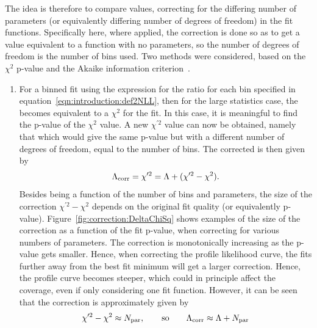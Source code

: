 The idea is therefore to compare \nll values,
correcting for the differing number of parameters
(or equivalently differing number of degrees of freedom) in
the fit functions. Specifically here, where applied, the correction is
done so as to get a value equivalent to a function with no parameters, so
the number of degrees of freedom is the number of bins used.
Two methods were considered, based on the
$\chi^2$ p-value and the Akaike information
criterion~\cite{ref:correction:akaike}.
\begin{enumerate}
\item %
For a binned fit using the expression for the \nll ratio
for each bin specified in equation~\ref{eqn:introduction:def2NLL}, then for
the large statistics case, the \nll becomes equivalent to a $\chi^2$ for the
fit. In this case, it is meaningful to find the p-value of the $\chi^2$ value.
A new $\chi^{\prime 2}$
value can now be obtained, namely that which would give the same p-value but
with a different number of degrees of freedom, equal to the number of bins.
The corrected \nll is then given by
\begin{displaymath}
\Lambda_{\mathrm{corr}} = \chi^{\prime 2} = \textrm{\ensuremath{\Lambda}} + (\chi^{\prime 2} - \chi^2).
\end{displaymath}
Besides being a function of the number of bins and parameters,
the size of the correction $\chi^{\prime 2} - \chi^2$
depends on the original fit quality
(or equivalently p-value). Figure~\ref{fig:correction:DeltaChiSq}
shows examples of the size of the correction as a function of the
fit p-value, when correcting for various numbers of parameters.
The correction is monotonically increasing as the p-value gets smaller.
Hence, when correcting the profile likelihood curve, the fits further away from
the best fit minimum will get a larger correction. Hence, the profile curve
becomes steeper, which could in principle affect the coverage, even if
only considering one fit function.
However, it can be seen that the correction is approximately given by
\begin{displaymath}
\chi^{\prime 2} - \chi^2 \approx N_{\rm par},
\qquad{\rm so}\qquad
\Lambda_{\mathrm{corr}} \approx \textrm{\ensuremath{\Lambda}} + N_{\rm par}
\end{displaymath}

\end{enumerate}
